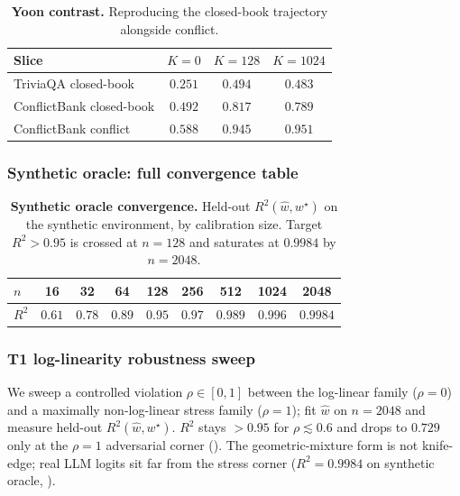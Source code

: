 \begin{table}[H]
\centering\small
\caption{\textbf{Yoon contrast.}  Reproducing the closed-book trajectory
\citep{yoon2025confidence} alongside conflict.}
\label{tab:yoon-contrast}
\setlength{\tabcolsep}{4pt}
\begin{tabular}{lccc}
\toprule
\textbf{Slice} & $K{=}0$ & $K{=}128$ & $K{=}1024$\\
\midrule
TriviaQA closed-book      & $0.251$ & $0.494$ & $0.483$\\
ConflictBank closed-book  & $0.492$ & $0.817$ & $0.789$\\
ConflictBank conflict     & $0.588$ & $0.945$ & $0.951$\\
\bottomrule
\end{tabular}
\end{table}

\subsubsection{Synthetic oracle: full convergence table}

\begin{table}[H]
\centering
\small
\caption{\textbf{Synthetic oracle convergence.}  Held-out $R^2(\hat w,w^\star)$
on the synthetic environment, by calibration size.  Target $R^2\!>\!0.95$ is
crossed at $n=128$ and saturates at $0.9984$ by $n=2048$.}
\label{tab:oracle-convergence}
\begin{tabular}{lcccccccc}
\toprule
$n$ & 16 & 32 & 64 & 128 & 256 & 512 & 1024 & 2048\\
\midrule
$R^2$ & $0.61$ & $0.78$ & $0.89$ & $0.95$ & $0.97$ & $0.989$ & $0.996$ & $\mathbf{0.9984}$\\
\bottomrule
\end{tabular}
\end{table}

\subsubsection{T1 log-linearity robustness sweep}
\label{app:loglin-robustness}

We sweep a controlled violation $\rho\!\in\![0,1]$ between the
log-linear family ($\rho\!=\!0$) and a maximally non-log-linear
stress family ($\rho\!=\!1$); fit $\hat w$ on $n\!=\!2048$ and
measure held-out $R^2(\hat w,w^\star)$.  $R^2$ stays $>\!0.95$ for
$\rho\!\lesssim\!0.6$ and drops to $0.729$ only at the
$\rho\!=\!1$ adversarial corner ().
The geometric-mixture form is not knife-edge; real LLM logits sit
far from the stress corner ($R^2\!=\!0.9984$ on synthetic oracle,
).

